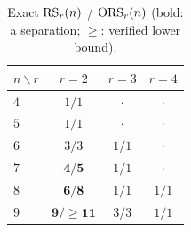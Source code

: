 \begin{table}[t]\centering\small
\begin{tabular}{@{}lccc@{}}
\toprule
$n \backslash r$ & $r=2$ & $r=3$ & $r=4$ \\
\midrule
$4$ & $1/1$ & $\cdot$ & $\cdot$ \\
$5$ & $1/1$ & $\cdot$ & $\cdot$ \\
$6$ & $3/3$ & $1/1$ & $\cdot$ \\
$7$ & $\mathbf{4/5}$ & $1/1$ & $\cdot$ \\
$8$ & $\mathbf{6/8}$ & $1/1$ & $1/1$ \\
$9$ & $\mathbf{9/\ge 11}$ & $3/3$ & $1/1$ \\
\bottomrule
\end{tabular}
\caption{Exact $\mathrm{RS}_r(n)$ / $\mathrm{ORS}_r(n)$ (bold: a separation; $\ge$: verified lower bound).}
\label{tab:grid}
\end{table}
